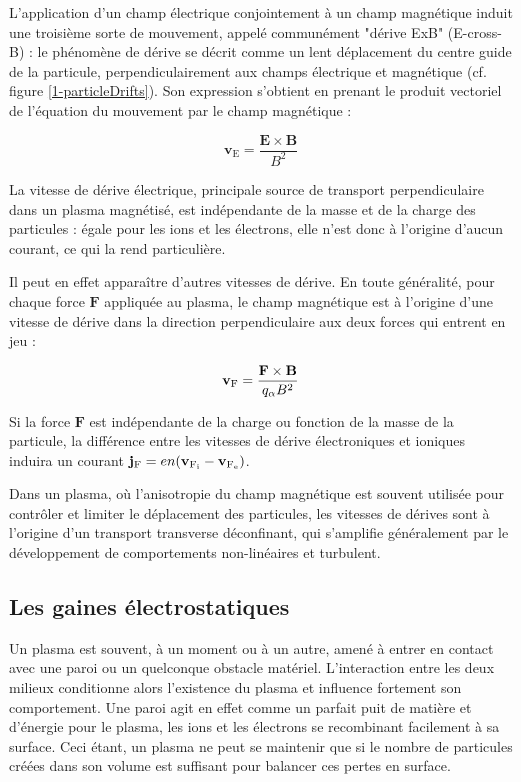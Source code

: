 \begin{refsection}
L'application d'un champ électrique conjointement à un champ magnétique
induit une troisième sorte de mouvement, appelé communément "dérive
ExB" (E-cross-B) : le phénomène de dérive se décrit comme un lent déplacement du
centre guide de la particule, perpendiculairement aux champs électrique et
magnétique (cf. figure \ref{1-particleDrifts}). Son expression s'obtient en
prenant le produit vectoriel de l'équation du mouvement par le champ magnétique
:

\begin{equation}
\mathbf{v}_\text{E}=\frac{\mathbf{E}\times\mathbf{B}}{B^2}
\end{equation}

La vitesse de dérive électrique, principale source de transport perpendiculaire
dans un plasma magnétisé, est indépendante de la masse et de la charge des
particules : égale pour les ions et les électrons, elle n'est donc à
l'origine d'aucun courant, ce qui la rend particulière. 

Il peut en effet apparaître d'autres vitesses de dérive. En toute généralité, 
pour chaque force $\mathbf F$ appliquée au plasma, le champ magnétique est à
l'origine d'une vitesse de dérive dans la direction perpendiculaire aux deux
forces qui entrent en jeu :

\begin{equation}
\mathbf{v}{_{\text{F}}}=\frac{\mathbf{F}\times\mathbf{B}}{q_\alpha B^2}
\end{equation}

Si la force $\mathbf F$ est indépendante de la charge ou
fonction de la masse de la particule, la différence entre les vitesses de dérive
électroniques et ioniques induira un courant $\mathbf
j{_{\text{F}}}=en(\mathbf v{_{\text{F}_\text{i}}}-\mathbf
v{_{\text{F}_\text{e}}})$. 

Dans un plasma, où l'anisotropie du champ
magnétique est souvent utilisée pour contrôler et limiter le déplacement des
particules, les vitesses de dérives sont à l'origine d'un transport
 transverse déconfinant, qui s'amplifie généralement par le développement de
 comportements non-linéaires et turbulent.
\subsection{Les gaines électrostatiques}
\label{1-gaines}
Un plasma est souvent, à un moment ou à un autre, amené à entrer en contact avec
une paroi ou un quelconque obstacle matériel. L'interaction entre
les deux milieux conditionne alors l'existence du plasma et influence
fortement son comportement. Une paroi agit en effet comme un parfait
puit de matière et d'énergie pour le plasma, les ions et les électrons se
recombinant facilement à sa surface. Ceci étant, un plasma ne peut se maintenir
que si le nombre de particules créées dans son volume est suffisant pour
balancer ces pertes en surface. 


\end{refsection}
